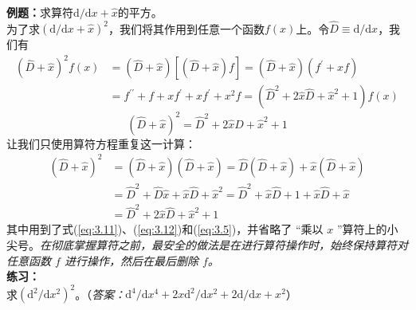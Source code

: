 	\begin{examplebox}
		\textbf{例题：}求算符$\mathrm{d}/\mathrm{d}x+\hat{x}$的平方。\\
		
		为了求$\left(\mathrm{d}/\mathrm{d}x+\hat{x}\right)^2$，我们将其作用到任意一个函数$f\left(x\right)$上。令$\hat{D} \equiv \mathrm{d}/\mathrm{d}x$，我们有
		\begin{equation*}
			\begin{aligned}
				\left(\hat{D}+\hat{x}\right)^2f\left(x\right) & = \left(\hat{D}+\hat{x}\right)\left[\left(\hat{D}+\hat{x}\right)f\right] = \left(\hat{D}+\hat{x}\right)\left(f^{\prime}+xf\right) \\
				& = f^{\prime \prime}+f+xf^{\prime}+xf^{\prime}+x^2f=\left(\hat{D}^2+2\hat{x}\hat{D}+\hat{x}^2+1\right)f\left(x\right)
			\end{aligned}
		\end{equation*}
		\begin{equation*}
			\left(\hat{D}+\hat{x}\right)^2 = \hat{D}^2+2\hat{x}\hat{D}+\hat{x}^2+1
		\end{equation*}
		让我们只使用算符方程重复这一计算：
		\begin{equation*}
			\begin{aligned}
				\left(\hat{D}+\hat{x}\right)^2 & = \left(\hat{D}+\hat{x}\right)\left(\hat{D}+\hat{x}\right) = \hat{D}\left(\hat{D}+\hat{x}\right)+\hat{x}\left(\hat{D}+\hat{x}\right) \\
				& = \hat{D}^2+\hat{D}\hat{x}+\hat{x}\hat{D}+\hat{x}^2 = \hat{D}^2+\hat{x}\hat{D}+1+\hat{x}\hat{D}+\hat{x} \\
				& = \hat{D}^2+2\hat{x}\hat{D}+\hat{x}^2+1
			\end{aligned}
		\end{equation*}
		其中用到了式(\ref{eq:3.11})、(\ref{eq:3.12})和(\ref{eq:3.5})，并省略了 “乘以 $x$ ”算符上的小尖号。\textit{在彻底掌握算符之前，最安全的做法是在进行算符操作时，始终保持算符对任意函数 $f$ 进行操作，然后在最后删除 $f$。}\\
		
		\textbf{练习：}\\
		求$\left(\mathrm{d}^2/\mathrm{d}x^2\right)^2$。（\textit{答案：}$\mathrm{d}^4/\mathrm{d}x^4+2x\mathrm{d}^2/\mathrm{d}x^2+2\mathrm{d}/\mathrm{d}x+x^2$）
	\end{examplebox}
	
